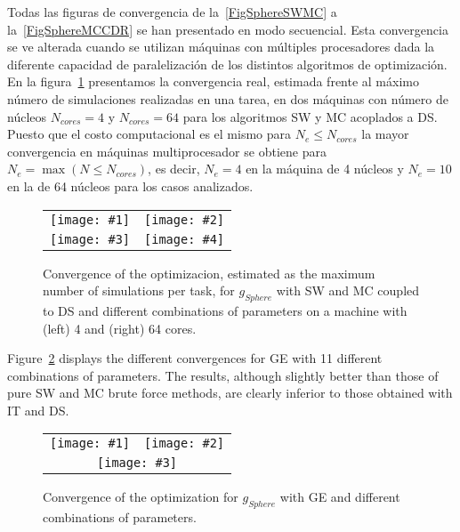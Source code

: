 \documentclass[review,authoryear]{elsarticle}
\newcommand{\FIGIII}[5]
{
	\begin{figure}[ht!]
		\centering
		\begin{tabular}{cc}
			\texttt{[image: \#1]} & \texttt{[image: \#2]} \\
			\multicolumn{2}{c}{\texttt{[image: \#3]}}
		\end{tabular}
		\caption{#4.\label{#5}}
	\end{figure}
}
\newcommand{\FIGIV}[6]
{
	\begin{figure}[ht!]
		\centering
		\begin{tabular}{cc}
			\texttt{[image: \#1]} & \texttt{[image: \#2]} \\
			\texttt{[image: \#3]} & \texttt{[image: \#4]}
		\end{tabular}
		\caption{#5.\label{#6}}
	\end{figure}
}
\newcommand{\PA}[1]{\left(#1\right)}
\begin{document}
Todas las figuras de convergencia de la~\ref{FigSphereSWMC} a
la~\ref{FigSphereMCCDR} se han presentado en modo secuencial. Esta convergencia
se ve alterada cuando se utilizan máquinas con múltiples procesadores dada la
diferente capacidad de paralelización de los distintos algoritmos de
optimización. En la figura~\ref{FigSphereSWMCDS} presentamos la convergencia
real, estimada frente al máximo número de simulaciones realizadas en una tarea,
en dos máquinas con número de núcleos $N_{cores}=4$ y $N_{cores}=64$ para los
algoritmos SW y MC acoplados a DS. Puesto que el costo computacional es el
mismo para $N_e\leq N_{cores}$ la mayor convergencia en máquinas multiprocesador
se obtiene para $N_e=\max\PA{N\leq N_{cores}}$, es decir, $N_e=4$ en la máquina
de 4 núcleos y $N_e=10$ en la de 64 núcleos para los casos analizados.
\FIGIV{sphere-task-1-4.eps}{sphere-task-1-64.eps}
{sphere-task-2-4.eps}{sphere-task-2-64.eps}
{Convergence of the optimizacion, estimated as the maximum number of simulations
per task, for $g_{Sphere}$ with SW and MC coupled to DS and different
combinations of parameters on a machine with (left) 4 and (right) 64 cores}
{FigSphereSWMCDS}

Figure~\ref{FigSphereGE} displays the different convergences for GE with 11
different combinations of parameters. The results, although slightly better than
those of pure SW and MC brute force methods, are clearly inferior to those
obtained with IT and DS. 
\FIGIII{sphere-evolution-ge-1-4.eps}{sphere-evolution-ge-5-8.eps}
{sphere-evolution-ge-9-11.eps}{Convergence of the optimization for $g_{Sphere}$
with GE and different combinations of parameters}{FigSphereGE}
\end{document}

